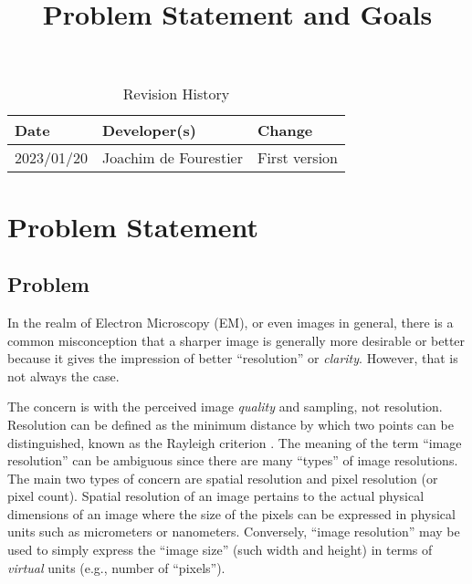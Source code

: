 \documentclass{article}
\title{Problem Statement and Goals\\\progname}
\author{\authname}
\date{}
\begin{document}
\maketitle

\begin{table}[hp] \caption{Revision History} \label{TblRevisionHistory}
\begin{tabularx}{\textwidth}{llX} \toprule \textbf{Date} & \textbf{Developer(s)}& \textbf{Change}\\ \midrule 2023/01/20 & Joachim de Fourestier & First
version\\ %
\bottomrule \end{tabularx} \end{table}

\section{Problem Statement}
\subsection{Problem}
In the realm of Electron Microscopy (EM), or even images in general, there is a
common misconception that a sharper image is generally more desirable or better
because it gives the impression of better “resolution” or {\it clarity}.
However, that is not always the case.

The concern is with the perceived image {\it quality} and sampling, not
resolution. Resolution can be defined as the minimum distance by which two
points can be distinguished, known as the Rayleigh criterion
\cite{blackburn_microscopy_2020}. The meaning of the term “image resolution” can
be ambiguous since there are many “types” of image resolutions. The main two
types of concern are spatial resolution and pixel resolution (or pixel count).
Spatial resolution of an image pertains to the actual physical dimensions of an
image where the size of the pixels can be expressed in physical units such as
micrometers or nanometers. Conversely, “image resolution” may be used to simply
express the “image size” (such width and height) in terms of {\it virtual} units
(e.g., number of “pixels”).
\end{document}
